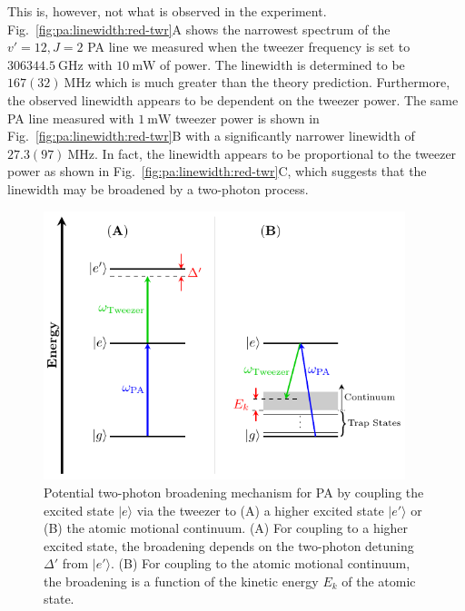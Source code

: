 This is, however, not what is observed in the experiment.
Fig.~\ref{fig:pa:linewidth:red-twr}A shows the narrowest spectrum of the $v'=12, J=2$ PA line
we measured when the tweezer frequency is set to $306344.5~\mathrm{GHz}$
with $10~\mathrm{mW}$ of power. The linewidth is determined to be $167(32)~\mathrm{MHz}$
which is much greater than the theory prediction.
Furthermore, the observed linewidth appears to be dependent on the tweezer power.
The same PA line measured with $1~\mathrm{mW}$ tweezer power
is shown in Fig.~\ref{fig:pa:linewidth:red-twr}B with a significantly narrower linewidth
of $27.3(97)~\mathrm{MHz}$.
In fact, the linewidth appears to be proportional to the tweezer power
as shown in Fig.~\ref{fig:pa:linewidth:red-twr}C,
which suggests that the linewidth may be broadened by a two-photon process.

\begin{figure}
  \centering
  \includegraphics[width=0.939\textwidth]{figures/pa_two_photon_up_vs_down.pdf}
  \caption[Two-photon broadening mechanism for PA.]{
    Potential two-photon broadening mechanism for PA by coupling the excited state $|e\rangle$
    via the tweezer to (A) a higher excited state $|e'\rangle$ or
    (B) the atomic motional continuum.
    (A) For coupling to a higher excited state,
    the broadening depends on the two-photon detuning $\Delta'$ from $|e'\rangle$.
    (B) For coupling to the atomic motional continuum,
    the broadening is a function of the kinetic energy $E_k$ of the atomic state.
    \label{fig:pa:linewidth:up-vs-down}}
\end{figure}

